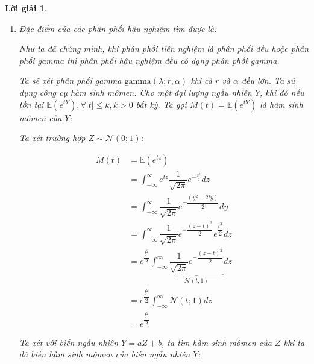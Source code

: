 \documentclass[14pt, a4paper]{article}
\theoremstyle{sltheorem}
\theoremstyle{soltheorem}
\newtheorem*{loigiai}{Lời giải}
\begin{document}
\begin{loigiai}
\begin{enumerate}
\begin{enumerate}[label=(\alph*)]
            Như vậy ta nhận thấy phân phối hậu nghiệm $g(\lambda \vert X_1 =x_1, X_2=x_2, \dots, X_n=x_n)$ của $\lambda$ cũng chính là phân phối gamma khi phân phối tiên nghiệm của $\lambda$ là phân phối gamma.
        \end{enumerate}

        Để kiểm chứng các phân phối hậu nghiệm tìm được từ lý thuyết, ta sẽ sử dụng thực nghiệm để kiểm chứng các phân phối hậu nghiệm vừa tìm được
        \item Đặc điểm của các phân phối hậu nghiệm tìm được là:
        
        Như ta đã chứng minh, khi phân phối tiên nghiệm là phân phối đều hoặc phân phối gamma thì phân phối hậu nghiệm đều có dạng phân phối gamma.

        Ta sẽ xét phân phối gamma $\text{gamma}(\lambda; r, \alpha)$ khi cả $r$ và $\alpha$ đều lớn.
        Ta sử dụng công cụ hàm sinh mômen.
        Cho một đại lượng ngẫu nhiên $Y$, khi đó nếu tồn tại $\mathbb{E}(e^{tY}), \forall \lvert t \rvert \leq k, k > 0$ bất kỳ.
        Ta gọi $M(t) = \mathbb{E}(e^{tY})$ là hàm sinh mômen của $Y$:

        Ta xét trường hợp $Z \sim \mathcal{N}(0; 1)$:

        \begin{equation*}
            \begin{aligned}
                M(t) &= \mathbb{E}(e^{tz}) \\
                &=\int_{-\infty}^{\infty} e^{tz} \dfrac{1}{\sqrt{2\pi}} e^{-\frac{z^2}{2}} dz \\
                &=\int_{-\infty}^{\infty} \dfrac{1}{\sqrt{2\pi}} e^{-\dfrac{(y^2-2ty)}{2}} dy \\
                &=\int_{-\infty}^{\infty} \dfrac{1}{\sqrt{2\pi}} e^{-\dfrac{(z-t)^2}{2}}e^{\dfrac{t^2}{2}} dz \\
                &=e^{\dfrac{t^2}{2}}\int_{-\infty}^{\infty} \underbrace{\dfrac{1}{\sqrt{2\pi}} e^{-\dfrac{(z-t)^2}{2}}}_{\mathcal{N}(t;1)} dz \\
                &=e^{\dfrac{t^2}{2}}\int_{-\infty}^{\infty} \mathcal{N}(t;1) dz \\
                &=e^{\dfrac{t^2}{2}}
            \end{aligned}
        \end{equation*}

        Ta xét với biến ngẫu nhiên $Y = aZ + b$, ta tìm hàm sinh mômen của $Z$ khi ta đã biến hàm sinh mômen của biến ngẫu nhiên $Y$:


\end{enumerate}
\end{loigiai}
\end{document}
